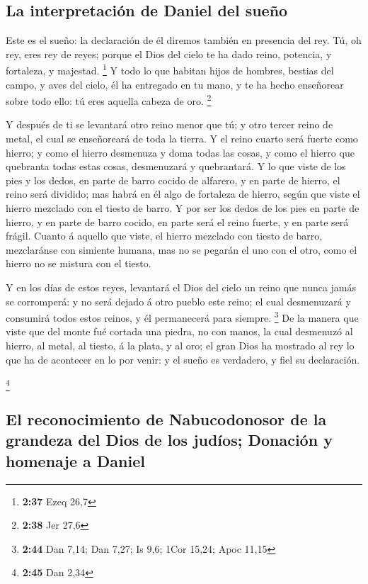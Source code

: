 \hypertarget{la-interpretaciuxf3n-de-daniel-del-sueuxf1o}{%
\subsection{La interpretación de Daniel del
sueño}\label{la-interpretaciuxf3n-de-daniel-del-sueuxf1o}}

 Este es el sueño: la declaración de él diremos también en
presencia del rey.  Tú, oh rey, eres rey de reyes; porque
el Dios del cielo te ha dado reino, potencia, y fortaleza, y majestad.
\footnote{\textbf{2:37} Ezeq 26,7}  Y todo lo que habitan
hijos de hombres, bestias del campo, y aves del cielo, él ha entregado
en tu mano, y te ha hecho enseñorear sobre todo ello: tú eres aquella
cabeza de oro. \footnote{\textbf{2:38} Jer 27,6}

 Y después de ti se levantará otro reino menor que tú; y
otro tercer reino de metal, el cual se enseñoreará de toda la tierra.
 Y el reino cuarto será fuerte como hierro; y como el
hierro desmenuza y doma todas las cosas, y como el hierro que quebranta
todas estas cosas, desmenuzará y quebrantará.  Y lo que
viste de los pies y los dedos, en parte de barro cocido de alfarero, y
en parte de hierro, el reino será dividido; mas habrá en él algo de
fortaleza de hierro, según que viste el hierro mezclado con el tiesto de
barro.  Y por ser los dedos de los pies en parte de hierro,
y en parte de barro cocido, en parte será el reino fuerte, y en parte
será frágil.  Cuanto á aquello que viste, el hierro
mezclado con tiesto de barro, mezclaránse con simiente humana, mas no se
pegarán el uno con el otro, como el hierro no se mistura con el tiesto.

 Y en los días de estos reyes, levantará el Dios del cielo
un reino que nunca jamás se corromperá: y no será dejado á otro pueblo
este reino; el cual desmenuzará y consumirá todos estos reinos, y él
permanecerá para siempre. \footnote{\textbf{2:44} Dan 7,14; Dan 7,27; Is
  9,6; 1Cor 15,24; Apoc 11,15}  De la manera que viste que
del monte fué cortada una piedra, no con manos, la cual desmenuzó al
hierro, al metal, al tiesto, á la plata, y al oro; el gran Dios ha
mostrado al rey lo que ha de acontecer en lo por venir: y el sueño es
verdadero, y fiel su declaración.

\footnote{\textbf{2:45} Dan 2,34}

\hypertarget{el-reconocimiento-de-nabucodonosor-de-la-grandeza-del-dios-de-los-juduxedos-donaciuxf3n-y-homenaje-a-daniel}{%
\subsection{El reconocimiento de Nabucodonosor de la grandeza del Dios
de los judíos; Donación y homenaje a
Daniel}\label{el-reconocimiento-de-nabucodonosor-de-la-grandeza-del-dios-de-los-juduxedos-donaciuxf3n-y-homenaje-a-daniel}}

